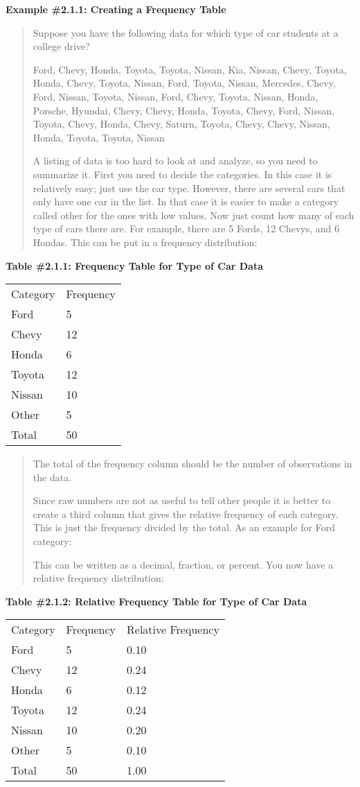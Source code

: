 \documentclass[]{book}
\begin{document}
\textbf{Example \#2.1.1: Creating a Frequency Table}

\begin{quote}
Suppose you have the following data for which type of car students at
a college drive?

Ford, Chevy, Honda, Toyota, Toyota, Nissan, Kia, Nissan, Chevy,
Toyota, Honda, Chevy, Toyota, Nissan, Ford, Toyota, Nissan, Mercedes,
Chevy, Ford, Nissan, Toyota, Nissan, Ford, Chevy, Toyota, Nissan,
Honda, Porsche, Hyundai, Chevy, Chevy, Honda, Toyota, Chevy, Ford,
Nissan, Toyota, Chevy, Honda, Chevy, Saturn, Toyota, Chevy, Chevy,
Nissan, Honda, Toyota, Toyota, Nissan

A listing of data is too hard to look at and analyze, so you need to
summarize it. First you need to decide the categories. In this case it
is relatively easy; just use the car type. However, there are several
cars that only have one car in the list. In that case it is easier to
make a category called other for the ones with low values. Now just
count how many of each type of cars there are. For example, there are
5 Fords, 12 Chevys, and 6 Hondas. This can be put in a frequency
distribution:
\end{quote}

\textbf{Table \#2.1.1: Frequency Table for Type of Car Data}

\begin{longtable}[]{@{}ll@{}}
\toprule
\endhead
Category & Frequency\tabularnewline
Ford & 5\tabularnewline
Chevy & 12\tabularnewline
Honda & 6\tabularnewline
Toyota & 12\tabularnewline
Nissan & 10\tabularnewline
Other & 5\tabularnewline
Total & 50\tabularnewline
\bottomrule
\end{longtable}

\begin{quote}
The total of the frequency column should be the number of observations
in the data.

Since raw numbers are not as useful to tell other people it is better
to create a third column that gives the relative frequency of each
category. This is just the frequency divided by the total. As an
example for Ford category:

This can be written as a decimal, fraction, or percent. You now have a
relative frequency distribution:
\end{quote}

\textbf{Table \#2.1.2: Relative Frequency Table for Type of Car Data}

\begin{longtable}[]{@{}lll@{}}
\toprule
\endhead
Category & Frequency & Relative Frequency\tabularnewline
Ford & 5 & 0.10\tabularnewline
Chevy & 12 & 0.24\tabularnewline
Honda & 6 & 0.12\tabularnewline
Toyota & 12 & 0.24\tabularnewline
Nissan & 10 & 0.20\tabularnewline
Other & 5 & 0.10\tabularnewline
Total & 50 & 1.00\tabularnewline
\bottomrule
\end{longtable}
\end{document}

